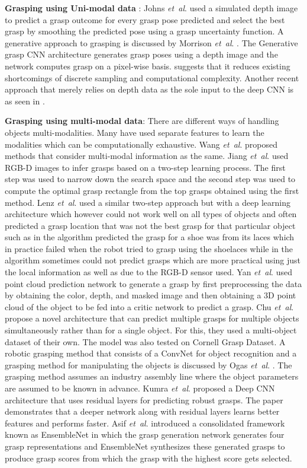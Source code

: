 \documentclass[letterpaper, 10 pt, conference]{ieeeconf}
\newcommand{\etal}{\textit{et~al}. }
\begin{document}
\textbf{Grasping using Uni-modal data} : Johns \etal \cite{johns2016deep} used a simulated depth image to predict a grasp outcome for every grasp pose predicted and select the best grasp by smoothing the predicted pose using a grasp uncertainty function. A generative approach to grasping is discussed by Morrison \etal \cite{morrison2019learning}. The Generative grasp CNN architecture generates grasp poses using a depth image and the network computes grasp on a pixel-wise basis. \cite{morrison2019learning} suggests that it reduces existing shortcomings of discrete sampling and computational complexity. Another recent approach that merely relies on depth data as the sole input to the deep CNN is as seen in \cite{schmidt2018grasping}.

\textbf{Grasping using multi-modal data}: There are different ways of handling objects multi-modalities. Many have used separate features to learn the modalities which can be computationally exhaustive. Wang \etal \cite{wang2016robot} proposed methods that consider multi-modal information as the same. Jiang \etal \cite{jiang2011efficient} used RGB-D images to infer grasps based on a two-step learning process. The first step was used to narrow down the search space and the second step was used to compute the optimal grasp rectangle from the top grasps obtained using the first method. Lenz \etal \cite{lenz2015deep} used a similar two-step approach but with a deep learning architecture which however could not work well on all types of objects and often predicted a grasp location that was not the best grasp for that particular object such as in \cite{jiang2011efficient} the algorithm predicted the grasp for a shoe was from its laces which in practice failed when the robot tried to grasp using the shoelaces while in \cite{lenz2015deep} the algorithm sometimes could not predict grasps which are more practical using just the local information as well as due to the RGB-D sensor used. Yan \etal \cite{yan2019data} used point cloud prediction network to generate a grasp by first preprocessing the data by obtaining the color, depth, and masked image and then obtaining a 3D point cloud of the object to be fed into a critic network to predict a grasp. Chu \etal \cite{chu2018real} propose a novel architecture that can predict multiple grasps for multiple objects simultaneously rather than for a single object. For this, they used a multi-object dataset of their own. The model was also tested on Cornell Grasp Dataset. A robotic grasping method that consists of a ConvNet for object recognition and a grasping method for manipulating the objects is discussed by Ogas \etal \cite{ogas2019robotic}. The grasping method assumes an industry assembly line where the object parameters are assumed to be known in advance. Kumra \etal \cite{kumra2017robotic} proposed a Deep CNN architecture that uses residual layers for predicting robust grasps. The paper demonstrates that a deeper network along with residual layers learns better features and performs faster. Asif \etal \cite{Asif2018EnsembleNetIG} introduced a consolidated framework known as EnsembleNet in which the grasp generation network generates four grasp representations and EnsembleNet synthesizes these generated grasps to produce grasp scores from which the grasp with the highest score gets selected.
\end{document}
